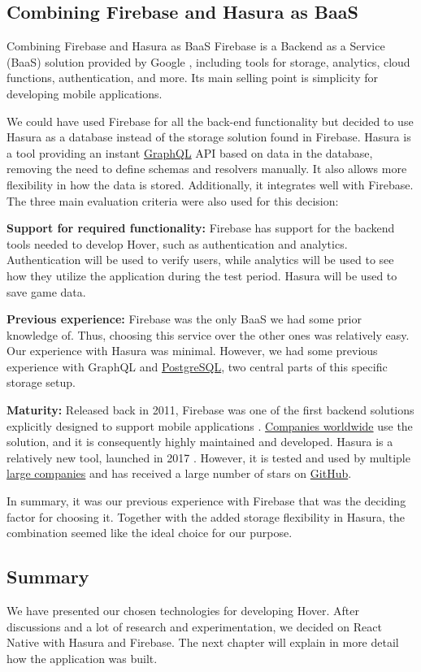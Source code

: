 \subsection{Combining Firebase and Hasura as BaaS}
Combining Firebase and Hasura as BaaS
Firebase is a Backend as a Service (BaaS) solution provided by Google \citep{tamplin_firebase_2014}, including tools for storage, analytics, cloud functions, authentication, and more. Its main selling point is simplicity for developing mobile applications.

We could have used Firebase for all the back-end functionality but decided to use Hasura as a database instead of the storage solution found in Firebase. Hasura is a tool providing an instant \href{https://graphql.org}{GraphQL} API based on data in the database, removing the need to define schemas and resolvers manually. It also allows more flexibility in how the data is stored. Additionally, it integrates well with Firebase. The three main evaluation criteria were also used for this decision:

\textbf{Support for required functionality:} Firebase has support for the backend tools needed to develop Hover, such as authentication and analytics.  Authentication will be used to verify users, while analytics will be used to see how they utilize the application during the test period. Hasura will be used to save game data.

\textbf{Previous experience:} Firebase was the only BaaS we had some prior knowledge of. Thus, choosing this service over the other ones was relatively easy. Our experience with Hasura was minimal. However, we had some previous experience with GraphQL and \href{https://www.postgresql.org}{PostgreSQL}, two central parts of this specific storage setup.

\textbf{Maturity:} Released back in 2011, Firebase was one of the first backend solutions explicitly designed to support mobile applications \citep{metz_firebase_2012}. \href{https://firebase.google.com}{Companies worldwide} use the solution, and it is consequently highly maintained and developed. Hasura is a relatively new tool, launched in 2017 \citep{hall_hasura_2018}. However, it is tested and used by multiple \href{https://hasura.io}{large companies} and has received a large number of stars on \href{https://github.com/hasura/graphql-engine}{GitHub}.

In summary, it was our previous experience with Firebase that was the deciding factor for choosing it. Together with the added storage flexibility in Hasura, the combination seemed like the ideal choice for our purpose.

\subsection{Summary}
We have presented our chosen technologies for developing Hover. After discussions and a lot of research and experimentation, we decided on React Native with Hasura and Firebase. The next chapter will explain in more detail how the application was built.